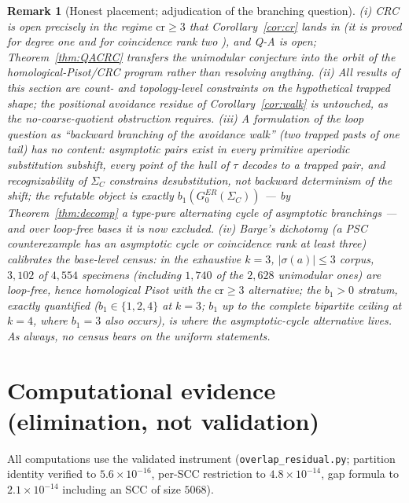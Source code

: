 \documentclass[11pt]{article}
\newtheorem{remark}[theorem]{Remark}
\begin{document}
\begin{remark}[Honest placement; adjudication of the branching
question]\label{rem:adjud}
(i) CRC is open precisely in the regime $\mathrm{cr}\ge3$ that
Corollary~\ref{cor:cr} lands in (it is proved for degree one
\cite{BBJS12} and for coincidence rank two \cite{B15}), and Q-A is
open; Theorem~\ref{thm:QACRC} transfers the unimodular conjecture into
the orbit of the homological-Pisot/CRC program rather than resolving
anything. (ii) All results of this section are count- and
topology-level constraints on the hypothetical trapped shape; the
positional avoidance residue of Corollary~\ref{cor:walk} is untouched,
as the no-coarse-quotient obstruction requires. (iii) A formulation of
the loop question as ``backward branching of the avoidance walk''
(two trapped pasts of one tail) has no content: asymptotic pairs exist
in every primitive aperiodic substitution subshift, every point of the
hull of $\tau$ decodes to a trapped pair, and recognizability of
$\Sigma_C$ constrains desubstitution, not backward determinism of the
shift; the refutable object is exactly $b_1(G_0^{ER}(\Sigma_C))$ ---
by Theorem~\ref{thm:decomp} a type-pure alternating cycle of
asymptotic branchings --- and over loop-free bases it is now excluded.
(iv) Barge's dichotomy \cite[Cor.~25]{B15} (a PSC counterexample has
an asymptotic cycle or coincidence rank at least three) calibrates the
base-level census: in the exhaustive $k=3$, $|\sigma(a)|\le3$ corpus,
$3{,}102$ of $4{,}554$ specimens (including $1{,}740$ of the $2{,}628$
unimodular ones) are loop-free, hence homological Pisot with the
$\mathrm{cr}\ge3$ alternative; the $b_1>0$ stratum, exactly
quantified ($b_1\in\{1,2,4\}$ at $k=3$; $b_1$ up to the complete
bipartite ceiling at $k=4$, where $b_1=3$ also occurs), is where the
asymptotic-cycle alternative lives. As always, no census bears on the
uniform statements.
\end{remark}

\section{Computational evidence (elimination, not validation)}

All computations use the validated instrument
(\texttt{overlap\_residual.py}; partition identity verified to
$5.6\times10^{-16}$, per-SCC restriction to $4.8\times10^{-14}$, gap
formula to $2.1\times10^{-14}$ including an SCC of size $5068$).
\end{document}
